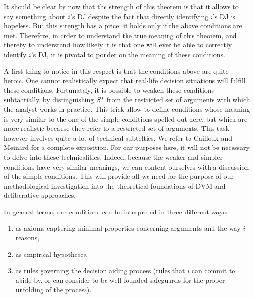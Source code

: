 \documentclass[version=3.21, pagesize, twoside=off, bibliography=totoc, DIV=calc, fontsize=12pt, a4paper, french, english]{scrartcl}
\begin{document}
It should be clear by now that the strength of this theorem is that it allows to say something about $i$'s \ac{DJ} despite the fact that directly identifying $i$'s \ac{DJ} is hopeless. But this strength has a price: it holds only if the above conditions are met. Therefore, in order to understand the true meaning of this theorem, and thereby to understand how likely it is that one will ever be able to correctly identify $i$'s \ac{DJ}, it is pivotal to ponder on the meaning of these conditions.

A first thing to notice in this respect is that the conditions above are quite heroic. One cannot realistically expect that real-life decision situations will fulfill these conditions. Fortunately, it is possible to weaken these conditions subtantially, by distinguishing $S^*$ from the restricted set of arguments with which the analyst works in practice.  This trick allow to define conditions whose meaning is very similar to the one of the simple conditions spelled out here, but which are more realistic because they refer to a restricted set of arguments. This task however involves quite a lot of technical subtelties. We refer to Cailloux and Meinard for a complete exposition. For our purposes here, it will not be necessary to delve into these technicalities. Indeed, because the weaker and simpler conditions have very similar meanings, we can content ourselves with a discussion of the simple conditions. This will provide all we need for the purpose of our methodological investigation into the theoretical foundations of DVM and deliberative approaches.

In general terms, our conditions can be interpreted in three different ways:
\begin{enumerate}[label=({\roman*})]%
	\item \label{inter:axioms} as axioms capturing minimal properties concerning arguments and the way $i$ reasons, 
	\item \label{inter:empir} as empirical hypotheses,
	\item \label{inter:rules} as rules governing the decision aiding process (rules that $i$ can commit to abide by, or can consider to be well-founded safeguards for the proper unfolding of the process).
\end{enumerate}
\end{document}
